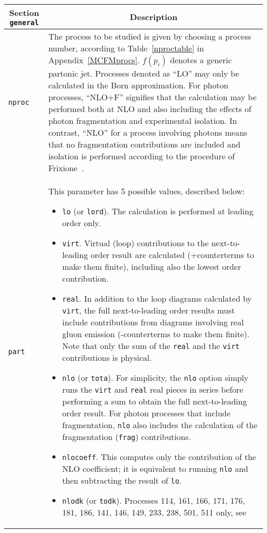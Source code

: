 \begin{longtable}{p{1.5cm}p{12cm}}
		\toprule
		\multicolumn{1}{c}{{\textbf{Section} \texttt{general}}} & \multicolumn{1}{c}{{\textbf{Description}}} \\ 
		\midrule
		\texttt{nproc} & 
		The process to be studied is given by
		choosing a process number, according to Table~\ref{nproctable}
		in Appendix~\ref{MCFMprocs}.
		$f(p_i)$ denotes a generic partonic jet. Processes denoted as
		``LO'' may only be calculated in the Born approximation. For photon
		processes, ``NLO+F'' signifies that the calculation may be performed
		both at NLO and also including the effects of photon fragmentation
		and experimental isolation. In contrast, ``NLO'' for a process involving
		photons means that no fragmentation contributions are included and isolation
		is performed according to the procedure of Frixione~\cite{Frixione:1998jh}.	\\
		\texttt{part} &
		This parameter has 5 possible values, described below:
		\begin{itemize}
			\item {\tt lo} (or {\tt lord}).
			The calculation is performed at leading order only.
			\item {\tt virt}.
			Virtual (loop) contributions to the next-to-leading order result are
			calculated (+counterterms to make them finite), including also the
			lowest order contribution.
			\item {\tt real}.
			In addition to the loop diagrams calculated by {\tt virt}, the full
			next-to-leading order results must include contributions from diagrams
			involving real gluon emission (-counterterms to make them finite).
			Note that only the sum of the {\tt real} and the {\tt virt} contributions
			is physical.
			\item {\tt nlo} (or {\tt tota}).
			For simplicity, the {\tt nlo} option simply runs the {\tt virt} and
			{\tt real} real pieces in series before performing a sum to obtain
			the full next-to-leading order result. For photon processes that include fragmentation,
			{\tt nlo} also includes the calculation of the fragmentation ({\tt frag})
			contributions.
			\item {\tt nlocoeff}.
			This computes only the contribution of the NLO coefficient;  it is equivalent
			to running {\tt nlo} and then subtracting the result of {\tt lo}.
			\item {\tt nlodk} (or {\tt todk}).
			Processes 114, 161, 166, 171, 176, 181, 186, 141, 146, 149, 233, 238, 501, 511 only, see 

\end{itemize}
\end{longtable}
